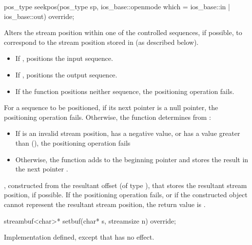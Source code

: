 %
\begin{itemdecl}
pos_type seekpos(pos_type sp, ios_base::openmode which
                  = ios_base::in | ios_base::out) override;
\end{itemdecl}

\begin{itemdescr}
\pnum
\effects
Alters the stream position within one of the
controlled sequences, if possible, to correspond to the
stream position stored in 
(as described below).
\begin{itemize}
\item
If
,
positions the input sequence.
\item
If
,
positions the output sequence.
\item
If the function positions neither sequence, the positioning operation fails.
\end{itemize}

\pnum
For a sequence to be positioned, if its next pointer is a null pointer,
the positioning operation fails.
Otherwise, the function determines  from
:
\begin{itemize}
\item
If  is an invalid stream position,
has a negative value, or
has a value greater than (),
the positioning operation fails
\item
Otherwise, the function
adds  to the beginning pointer  and
stores the result in the next pointer .
\end{itemize}

\pnum
\returns
{},
constructed from the resultant offset 
(of type
),
that stores the resultant stream position, if possible.
If the positioning operation fails, or
if the constructed object cannot represent the resultant stream position,
the return value is
.
\end{itemdescr}

%
\begin{itemdecl}
streambuf<char>* setbuf(char* s, streamsize n) override;
\end{itemdecl}

\begin{itemdescr}
\pnum
\effects
Implementation defined, except that
has no effect.%
\end{itemdescr}

